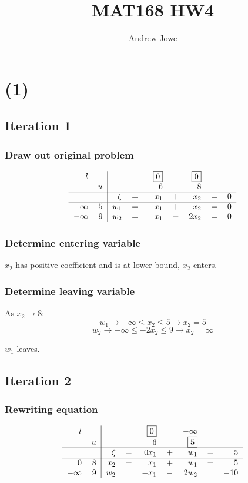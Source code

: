 \documentclass[14pt]{extarticle}
\title{MAT168 HW4}
\author{Andrew Jowe}
\begin{document}
\maketitle
\section*{(1)}
\subsection*{Iteration 1}
\subsubsection*{Draw out original problem}
\[\begin{tabular}{r r|r r r r r r r}
    $l$ & & & & \fbox{0} & & \fbox{0} & & \\
    & $u$ & & & 6 & & 8 & & \\
    \hline
    & & $\zeta$ & $=$ & $-x_1$ & $+$ & $x_2$ & $=$ & $0$ \\
    \hline
    $-\infty$ & $5$ & $w_1$ & $=$ & $-x_1$ & $+$ & $x_2$ & $=$ & $0$ \\
    $-\infty$ & $9$ & $w_2$ & $=$ & $x_1$ & $-$ & $2x_2$ & $=$ & $0$ \\
\end{tabular}\]

\subsubsection*{Determine entering variable}
$x_2$ has positive coefficient and is at lower bound, $x_2$ enters.

\subsubsection*{Determine leaving variable}
As $x_2 \to 8$:
\[w_1 \to -\infty \leq x_2 \leq 5 \to x_2 = 5\]
\[w_2 \to -\infty \leq -2x_2 \leq 9 \to x_2 = \infty\]

\bigskip $w_1$ leaves.

\subsection*{Iteration 2}
\subsubsection*{Rewriting equation}
\[\begin{tabular}{r r|r r r r r r r}
    $l$ & & & & \fbox{0} & & $-\infty$ & & \\
    & $u$ & & & $6$ & & \fbox{5} & & \\
    \hline
    & & $\zeta$ & $=$ & $0x_1$ & $+$ & $w_1$ & $=$ & $5$ \\
    \hline
    $0$ & $8$ & $x_2$ & $=$ & $x_1$ & $+$ & $w_1$ & $=$ & $5$ \\
    $-\infty$ & $9$ & $w_2$ & $=$ & $-x_1$ & $-$ & $2w_2$ & $=$ & $-10$ \\
\end{tabular}\]
\end{document}
